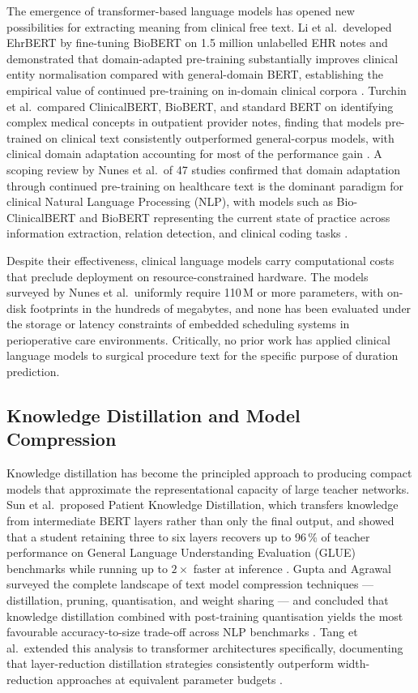 The emergence of transformer-based language models has opened new possibilities for extracting meaning from clinical free text. Li et al.\ developed EhrBERT by fine-tuning BioBERT on 1.5 million unlabelled EHR notes and demonstrated that domain-adapted pre-training substantially improves clinical entity normalisation compared with general-domain BERT, establishing the empirical value of continued pre-training on in-domain clinical corpora \cite{li2019fine}. Turchin et al.\ compared ClinicalBERT, BioBERT, and standard BERT on identifying complex medical concepts in outpatient provider notes, finding that models pre-trained on clinical text consistently outperformed general-corpus models, with clinical domain adaptation accounting for most of the performance gain \cite{turchin2023comparison}. A scoping review by Nunes et al.\ of 47 studies confirmed that domain adaptation through continued pre-training on healthcare text is the dominant paradigm for clinical Natural Language Processing (NLP), with models such as Bio-ClinicalBERT and BioBERT representing the current state of practice across information extraction, relation detection, and clinical coding tasks \cite{nunes2024health}.

Despite their effectiveness, clinical language models carry computational costs that preclude deployment on resource-constrained hardware. The models surveyed by Nunes et al.\ uniformly require 110\,M or more parameters, with on-disk footprints in the hundreds of megabytes, and none has been evaluated under the storage or latency constraints of embedded scheduling systems in perioperative care environments. Critically, no prior work has applied clinical language models to surgical procedure text for the specific purpose of duration prediction.

\subsection{Knowledge Distillation and Model Compression}
\label{sec:rw_kd}

Knowledge distillation has become the principled approach to producing compact models that approximate the representational capacity of large teacher networks. Sun et al.\ proposed Patient Knowledge Distillation, which transfers knowledge from intermediate BERT layers rather than only the final output, and showed that a student retaining three to six layers recovers up to 96\,\% of teacher performance on General Language Understanding Evaluation (GLUE) benchmarks while running up to $2\times$ faster at inference \cite{sun2019patient}. Gupta and Agrawal surveyed the complete landscape of text model compression techniques — distillation, pruning, quantisation, and weight sharing — and concluded that knowledge distillation combined with post-training quantisation yields the most favourable accuracy-to-size trade-off across NLP benchmarks \cite{gupta2022compression}. Tang et al.\ extended this analysis to transformer architectures specifically, documenting that layer-reduction distillation strategies consistently outperform width-reduction approaches at equivalent parameter budgets \cite{tang2024survey}.

